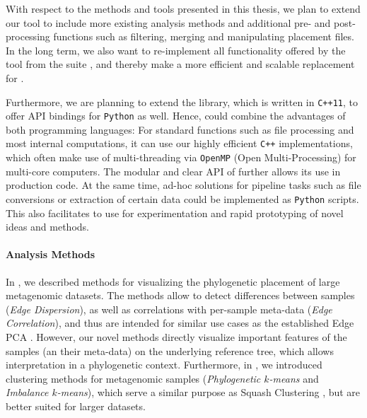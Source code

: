
With respect to the methods and tools presented in this thesis,
we plan to extend our  tool to include more existing analysis methods
and additional pre- and post-processing functions such as filtering, merging and manipulating placement files.
In the long term, we also want to re-implement all functionality offered by the
 tool from the  suite \cite{Matsen2010},
and thereby make  a more efficient and scalable replacement for .

Furthermore, we are planning to extend the  library, which is written in \texttt{C++11},
to offer \acs{API} bindings for \texttt{Python} as well.
Hence,  could combine the advantages of both programming languages:
For standard functions such as file processing and most internal computations,
it can use our highly efficient \texttt{C++} implementations,
which often make use of multi-threading via \texttt{OpenMP} (Open Multi-Processing) for multi-core computers.
The modular and clear \acs{API} of  further allows its use in production code.
At the same time, ad-hoc solutions for pipeline tasks such as file conversions or extraction of certain data
could be implemented as \texttt{Python} scripts.
This also facilitates to use  for experimentation and rapid prototyping of novel ideas and methods.

\paragraph{Analysis Methods}
\label{ch:ConclusionOutlook:par:AnalysisMethods}


In , we described methods for visualizing the phylogenetic placement of large metagenomic datasets.
The methods allow to detect differences between samples (\emph{Edge Dispersion}),
as well as correlations with per-sample meta-data (\emph{Edge Correlation}),
and thus are intended for similar use cases as the established Edge PCA \citep{Matsen2011a}.
However, our novel methods directly visualize important features of the samples (an their meta-data)
on the underlying reference tree, which allows interpretation in a phylogenetic context.
Furthermore, in , we introduced clustering methods for metagenomic samples
(\emph{Phylogenetic $k$-means} and \emph{Imbalance $k$-means}),
which serve a similar purpose as Squash Clustering \citep{Matsen2011a},
but are better suited for larger datasets.

